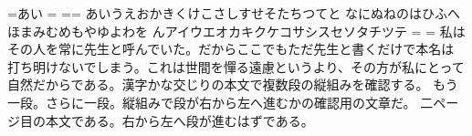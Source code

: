 \documentclass[pdflatex,tate,paper=a5,line_length=20zw]{jlreq}
\begin{document}
\setbox\@tempboxa=\hbox{あい}
\@tempdima=\dimexpr\wd{}\jlreq@zw\relax
\ifdim\@tempdima<\z@ \@tempdima=-\@tempdima\fi
\ifdim\@tempdima<0.5pt\relax
  \typeout{TATE-PASS: ORDER-advance-2zw (\the\wd\@tempboxa)}%
\else
  \typeout{TATE-FAIL: ORDER-advance-2zw (\the\wd\@tempboxa)}%
\fi
\setbox\@tempboxa=\vbox{\jlreq@zw\baselineskip=\baselineskip
  あいうえおかきくけこさしすせそたちつてと
  なにぬねのはひふへほまみむめもやゆよわを
  んアイウエオカキクケコサシスセソタチツテ}
\@tempdima=\ht\@tempboxa
\@tempdimb=\dimexpr\ht{}\jlreq@zw\relax
\ifdim\@tempdimb<\z@ \@tempdimb=-\@tempdimb\fi
\ifdim\@tempdimb<0.5pt\relax
  \typeout{TATE-PASS: WRAP-lines-4-parindent (\the\@tempdima)}%
\else
  \typeout{TATE-FAIL: WRAP-lines-4-parindent (\the\@tempdima, expected \the\dimexpr3\baselineskip+1\jlreq@zw\relax)}%
\fi
私はその人を常に先生と呼んでいた。だからここでもただ先生と書くだけで本名は
打ち明けないでしまう。これは世間を憚る遠慮というより、その方が私にとって
自然だからである。漢字かな交じりの本文で複数段の縦組みを確認する。
もう一段。さらに一段。縦組みで段が右から左へ進むかの確認用の文章だ。
\clearpage
二ページ目の本文である。右から左へ段が進むはずである。
\end{document}
